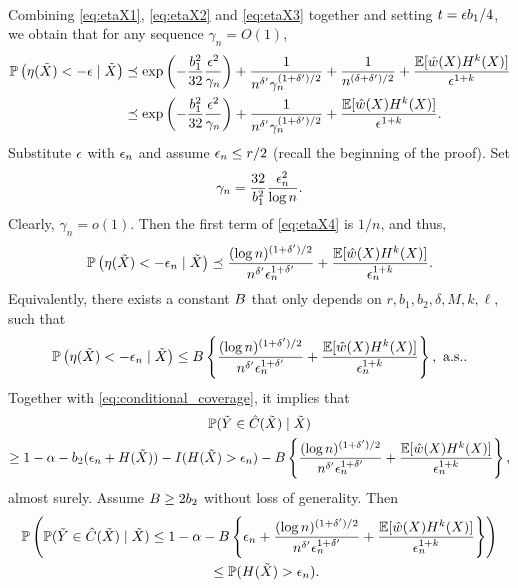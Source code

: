 ~\\
Combining \eqref{eq:etaX1}, \eqref{eq:etaX2} and \eqref{eq:etaX3} together and setting $t = \epsilon b_1 / 4$, we obtain that for any sequence $\gamma_{n} = O(1)$, 
\begin{align}
  \mathbb{P}\left(\eta(\tilde{X}) < -\epsilon\mid \tilde{X}\right) &\preceq \exp\left( - \frac{b_1^2}{32}\frac{\epsilon^2}{\gamma_{n}}\right) + \frac{1}{n^{\delta'}\gamma_{n}^{(1 + \delta') / 2}} + \frac{1}{n^{(\delta + \delta') / 2}} + \frac{\mathbb{E}[\hat{w}(X)H^{k}(X)]}{\epsilon^{1+k}}\nonumber\\
  & \preceq \exp\left( - \frac{b_1^2}{32}\frac{\epsilon^2}{\gamma_{n}}\right) + \frac{1}{n^{\delta'}\gamma_{n}^{(1 + \delta') / 2}} + \frac{\mathbb{E}[\hat{w}(X)H^{k}(X)]}{\epsilon^{1+k}}.  \label{eq:etaX4}
\end{align}
Substitute $\epsilon$ with $\epsilon_{n}$ and assume $\epsilon_{n} \le r / 2$
(recall the beginning of the proof). Set
\begin{equation}
  \label{eq:gamman}
  \gamma_{n} = \frac{32}{b_1^2}\frac{\epsilon_{n}^2}{\log n}.
\end{equation}
Clearly, $\gamma_{n} = o(1)$. Then the first term of \eqref{eq:etaX4} is $1 / n$, and thus, 
\[\mathbb{P}\left(\eta(\tilde{X}) < -\epsilon_{n}\mid \tilde{X}\right) \preceq \frac{(\log n)^{(1 + \delta') / 2}}{n^{\delta'}\epsilon_{n}^{1 + \delta'}} + \frac{\mathbb{E}[\hat{w}(X)H^{k}(X)]}{\epsilon_{n}^{1+k}}.\]
Equivalently, there exists a constant $B$ that only depends on $r, b_1, b_2, \delta, M, k, \ell$, such that
\[\mathbb{P}\left(\eta(\tilde{X}) < -\epsilon_{n}\mid \tilde{X}\right) \le B\left\{\frac{(\log n)^{(1 + \delta') / 2}}{n^{\delta'}\epsilon_{n}^{1 + \delta'}} + \frac{\mathbb{E}[\hat{w}(X)H^{k}(X)]}{\epsilon_{n}^{1+k}}\right\}, \,\, \text{a.s.}.\]
Together with \eqref{eq:conditional_coverage}, it implies that
\begin{multline*}
  \mathbb{P}(\tilde{Y} \in \hat{C}(\tilde{X}) \mid \tilde{X})\\
  \ge  1 - \alpha - b_{2}(\epsilon_{n} + H(\tilde{X})) - I(H(\tilde{X}) > \epsilon_{n}) - B\left\{\frac{(\log n)^{(1 + \delta') / 2}}{n^{\delta'}\epsilon_{n}^{1 + \delta'}} + \frac{\mathbb{E}[\hat{w}(X)H^{k}(X)]}{\epsilon_{n}^{1+k}}\right\},
\end{multline*}
almost surely. Assume $B\ge 2b_2$ without loss of generality. Then
\begin{multline}
  \mathbb{P}\left(\mathbb{P}(\tilde{Y} \in \hat{C}(\tilde{X}) \mid \tilde{X}) \le 1 - \alpha - B\left\{\epsilon_{n} + \frac{(\log n)^{(1 + \delta') / 2}}{n^{\delta'}\epsilon_{n}^{1 + \delta'}} + \frac{\mathbb{E}[\hat{w}(X)H^{k}(X)]}{\epsilon_{n}^{1+k}}\right\}\right)\\
  \quad \le \mathbb{P}(H(\tilde{X}) > \epsilon_{n}).\label{eq:conditional_coverage2}
\end{multline}
